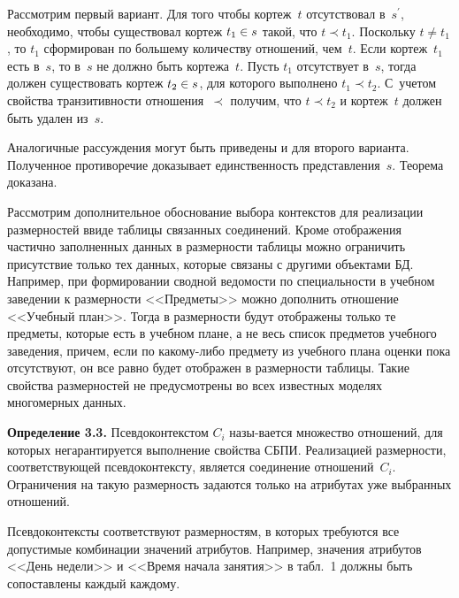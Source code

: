 \begin{multicols}{2}
  Рассмотрим первый вариант. Для того чтобы кортеж~$t$ отсутствовал 
в~$s^\prime$, необходимо, чтобы существовал кортеж $t_1\hm\in s$ такой, что 
$t\prec t_1$. Поскольку $t\not= t_1$, то $t_1$ сформирован по большему 
количеству отношений, чем~$t$. Если кортеж~$t_1$ есть в~$s$, то в~$s$ не 
должно быть кортежа~$t$. Пусть $t_1$ отсутствует в~$s$, тогда должен 
существовать кортеж $t_2\hm\in s$, для которого выполнено $t_1\prec t_2$. С~учетом 
свойства транзитивности отношения~$\prec$ получим, что $t\prec t_2$ и 
кортеж~$t$ должен быть удален из~$s$. 

Аналогичные рассуждения могут быть 
приведены и для второго варианта. Полученное противоречие доказывает 
единственность представления~$s$. Теорема доказана.
  
  \medskip
  
  Рассмотрим дополнительное обоснование выбора контекстов для реализации 
размерностей в\linebreak виде таблицы связанных соединений. Кроме отоб\-ра\-же\-ния 
частично заполненных данных в размерности таблицы можно ограничить 
присутствие только тех данных, которые связаны с другими объектами БД. 
Например, при формировании сводной ведомости по специальности в учебном 
заведении к размерности <<Предметы>> можно дополнить отношение 
<<Учебный план>>. Тогда в размерности будут отображены только те 
предметы, которые есть в учебном плане, а не весь список предметов учебного 
заведения, причем, если по ка\-ко\-му-ли\-бо предмету из учебного плана 
оценки пока отсутствуют, он все равно будет отображен в размерности 
таблицы. Такие свойства размерностей не предусмотрены во всех известных 
моделях многомерных данных.
  
  \smallskip
  
  \noindent
  \textbf{Определение 3.3.} Псевдоконтекстом $C_i$ назы-\linebreak вается множество 
отношений, для которых не\linebreak га\-рантируется выполнение свойства СБПИ. 
Реа\-лизаци\-ей размерности, соответствующей псевдоконтексту, является 
соединение отношений~$C_i$. Ограничения на такую размерность задаются 
только на атрибутах уже выбранных отношений.
  
  \smallskip
  
  Псевдоконтексты соответствуют размерностям, в которых требуются все 
допустимые комбинации значений атрибутов. Например, значения атрибутов 
<<День недели>> и <<Время начала занятия>> в табл.~1 должны быть 
сопоставлены каждый каж\-дому.
  

\end{multicols}
